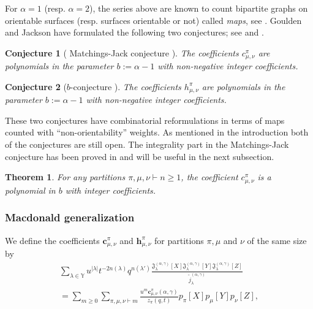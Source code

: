 \documentclass[12pt]{amsart}
\newtheorem{thm}{Theorem}[section]
\newtheorem{conj}{Conjecture}
\theoremstyle{remark}
\newcommand{\bfc}{\boldsymbol{c}}
\newcommand{\bfh}{\boldsymbol{h}}
\newcommand{\JJack}{{\mathfrak J}^{(\alpha,\gamma)}}
\newcommand{\normJt}{\widetilde{j}^{(\alpha,\gamma)}}
\begin{document}
For $\alpha=1$ (resp. $\alpha=2$), the series above are known to count bipartite graphs on orientable surfaces (resp. surfaces orientable or not) called \textit{maps}, see \cite{GouldenJackson1996a}. Goulden and Jackson have formulated the following two conjectures; see \cite[Conjecture 3.5]{GouldenJackson1996} and \cite[Conjecture 6.2]{GouldenJackson1996}.

\begin{conj}[ Matchings-Jack conjecture \cite{GouldenJackson1996}]\label{conj MJ}
    The coefficients $c^\pi_{\mu,\nu}$ are polynomials in the parameter $b:=\alpha-1$ with non-negative integer coefficients.
\end{conj}

\begin{conj}[\texorpdfstring{$b$}{}-conjecture \cite{GouldenJackson1996}]\label{b-conj}
    The coefficients $h^\pi_{\mu,\nu}$ are polynomials in the parameter $b:=\alpha-1$ with non-negative integer coefficients.
\end{conj}

These two conjectures have combinatorial reformulations in terms of maps counted with ``non-orientability'' weights. As mentioned in the introduction  both of the conjectures are still open. The integrality part in the Matchings-Jack conjecture has been proved in \cite{BenDali2023} and will be useful in the next subsection.
\begin{thm}\cite{BenDali2023}
    For any partitions $\pi,\mu,\nu\vdash n\geq 1$, the coefficient $c^\pi_{\mu,\nu}$ is a polynomial in $b$ with integer coefficients.  
\end{thm}

\subsubsection{Macdonald generalization}\label{ssec generalized conjectures}
We define the coefficients $\bfc^\pi_{\mu,\nu}$ and $\bfh^\pi_{\mu,\nu}$ for partitions $\pi,\mu$ and $\nu$ of the same size by 
\begin{multline}\label{eq def c}
    \sum_{\lambda\in\mathbb Y} u^{|\lambda|} t^{-2n(\lambda)}q^{n(\lambda')}\frac{\JJack_\lambda[X]\JJack_\lambda[Y]\JJack_\lambda[Z]}{\normJt_\lambda}\\
    =\sum_{m\geq 0}\sum_{\pi,\mu,\nu\vdash m} \frac{u^m \bfc^\pi_{\mu,\nu}(\alpha,\gamma)}{z_\pi(q,t)}p_\pi[X]p_\mu[Y]p_\nu[Z],
\end{multline}
\end{document}
